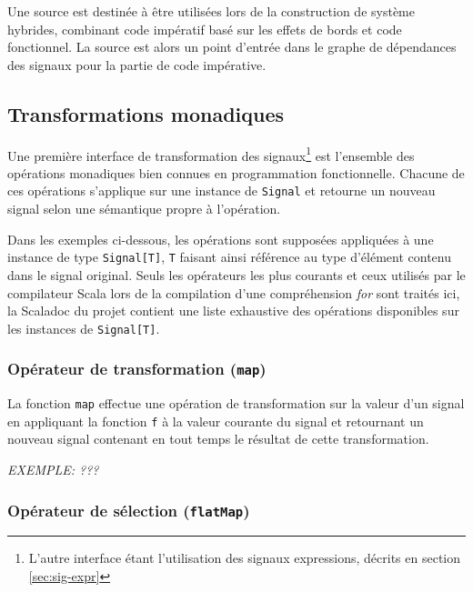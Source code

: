 Une source est destinée à être utilisées lors de la construction de système hybrides, combinant code impératif basé sur les effets de bords et code fonctionnel. La source est alors un point d'entrée dans le graphe de dépendances des signaux pour la partie de code impérative.

\subsection{Transformations monadiques}

Une première interface de transformation des signaux\footnote{L'autre interface étant l'utilisation des signaux expressions, décrits en section \ref{sec:sig-expr}} est l'ensemble des opérations monadiques bien connues en programmation fonctionnelle. Chacune de ces opérations s'applique sur une instance de \texttt{Signal} et retourne un nouveau signal selon une sémantique propre à l'opération.

Dans les exemples ci-dessous, les opérations sont supposées appliquées à une instance de type \texttt{Signal[T]}, \texttt{T} faisant ainsi référence au type d'élément contenu dans le signal original. Seuls les opérateurs les plus courants et ceux utilisés par le compilateur Scala lors de la compilation d'une compréhension \emph{for} sont traités ici, la Scaladoc du projet contient une liste exhaustive des opérations disponibles sur les instances de \texttt{Signal[T]}.

\subsubsection{Opérateur de transformation (\texttt{map})}

\begin{center}
\end{center}

La fonction \texttt{map} effectue une opération de transformation sur la valeur d'un signal en appliquant la fonction \texttt{f} à la valeur courante du signal et retournant un nouveau signal contenant en tout temps le résultat de cette transformation.

\textit{EXEMPLE: ???}

\subsubsection{Opérateur de sélection (\texttt{flatMap})}
	
\begin{center}
\end{center}


